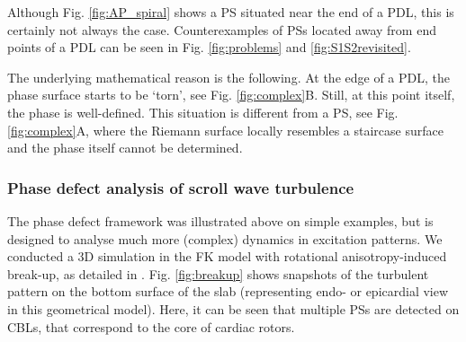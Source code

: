\documentclass{article}
\begin{document}
Although Fig. \ref{fig:AP_spiral} shows a PS situated near the end of a PDL, this is certainly not always the case. Counterexamples of PSs located away from end points of a PDL can be seen in Fig. \ref{fig:problems} and \ref{fig:S1S2revisited}. 

The underlying mathematical reason is the following. At the edge of a PDL, the phase surface starts to be `torn', see Fig. \ref{fig:complex}B. Still, at this point itself, the phase is well-defined. This situation is different from a PS, see Fig. \ref{fig:complex}A, where the Riemann surface locally resembles a staircase surface and the phase itself cannot be determined.  

\subsubsection{Phase defect analysis of scroll wave turbulence}

The phase defect framework was illustrated above on simple examples, but is designed to analyse much more (complex) dynamics in excitation patterns. We conducted a 3D simulation in the FK model with rotational anisotropy-induced break-up, as detailed in \citep{Fenton:1998}. Fig. \ref{fig:breakup} shows snapshots of the turbulent pattern on the bottom surface of the slab (representing endo- or epicardial view in this geometrical model). Here, it can be seen that multiple PSs are detected on CBLs, that correspond to the core of cardiac rotors. 
\end{document}
